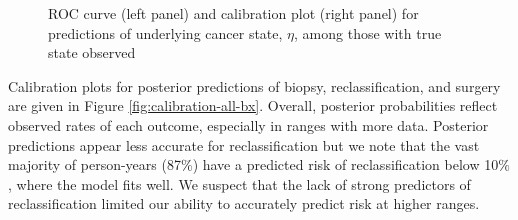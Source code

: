 \documentclass[12pt, letterpaper]{article}
\begin{document}
\begin{figure}
\begin{center}
\begin{subfigure}[b]{0.45\textwidth}
\label{fig:calibrartion-eta}
\end{subfigure}
\caption{ROC curve (left panel) and calibration plot (right panel) for predictions of underlying cancer state, $\eta$, among those with true state observed}
\label{fig:eta-accuracy}
\end{center}
\end{figure}


Calibration plots for posterior predictions of biopsy, reclassification, and surgery are given in Figure \ref{fig:calibration-all-bx}. Overall, posterior probabilities reflect observed rates of each outcome, especially in ranges with more data. Posterior predictions appear less accurate for reclassification but we note that the vast majority of person-years (87$\%$) have a predicted risk of reclassification below 10$\%$, where the model fits well. We suspect that the lack of strong predictors of reclassification limited our ability to accurately predict risk at higher ranges. 
\end{document}
